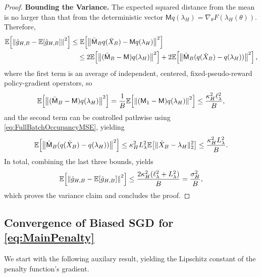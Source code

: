 \documentclass{article}
\theoremstyle{plain}
\theoremstyle{definition}
\theoremstyle{remark}
\newcommand{\Exp}[1]{{ \mathbb{E}}\!\left[#1\right]}
\DeclarePairedDelimiter{\norm}{\lVert}{\rVert}
\def\gApprox{{\hat{g}}}
\begin{document}
\begin{proof}
 \textbf{Bounding the Variance.}
 The expected squared distance from the mean is no larger
 than that from the deterministic vector
 $\mathsf Mq(\lambda_H)=\nabla_\theta F(\lambda_H(\theta))$. Therefore,
 \begin{align*}
  \Exp{\norm*{\gApprox_{H,B}-\Exp{\gApprox_{H,B}}}^2}
   & \leq
  \Exp{\norm*{\bar{\mathsf M}_Bq(\bar X_B)-\mathsf Mq(\lambda_H)}^2} \\
   & \quad\leq
  2\Exp{\norm*{(\bar{\mathsf M}_B-\mathsf M)q(\lambda_H)}^2}
  +2\Exp{\norm*{\bar{\mathsf M}_B(q(\bar X_B)-q(\lambda_H))}^2},
 \end{align*}
 where the first term is an average of independent, centered, fixed-pseudo-reward
 policy-gradient operators, so
 \begin{align*}
  \Exp{\norm*{(\bar{\mathsf M}_B-\mathsf M)q(\lambda_H)}^2}
  =\frac1B\Exp{\norm*{(\mathsf M_1-\mathsf M)q(\lambda_H)}^2}
  \leq\frac{\kappa_H^2\ell_\lambda^2}{B},
 \end{align*}
 and the second term can be controlled pathwise
 using \eqref{eq:FullBatchOccupancyMSE}, yielding
 \begin{align*}
  \Exp{\norm*{\bar{\mathsf M}_B(q(\bar X_B)-q(\lambda_H))}^2}
  \leq\kappa_H^2L_\lambda^2
  \Exp{\norm{\bar X_B-\lambda_H}_2^2}
  \leq\frac{\kappa_H^2L_\lambda^2}{B}.
 \end{align*}
 In total, combining the last three bounds, yields
 \begin{align*}
  \Exp{\norm*{\gApprox_{H,B}-\Exp{\gApprox_{H,B}}}^2}
  \leq\frac{2\kappa_H^2(\ell_\lambda^2+L_\lambda^2)}{B}
  =\frac{\sigma_H^2}{B},
 \end{align*}
 which proves the variance claim and concludes the proof.
\end{proof}

\subsection{Convergence of Biased SGD for \eqref{eq:MainPenalty}}
We start with the following auxilary result, yielding the
Lipschitz constant of the penalty function's gradient.
\end{document}
